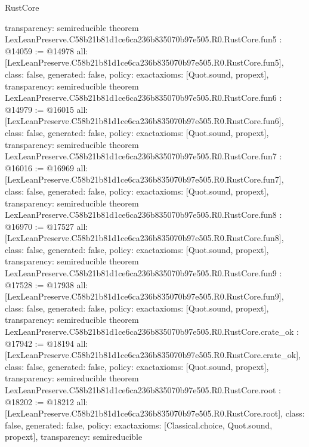 \begin{lexlean}{RustCore}
\begin{coremodule}
{  transparency: semireducible
}
theorem LexLeanPreserve.C58b21b81d1ce6ca236b835070b97e505.R0.RustCore.fun5 : @14059 := @14978 {
  all: [LexLeanPreserve.C58b21b81d1ce6ca236b835070b97e505.R0.RustCore.fun5],
  class: false,
  generated: false,
  policy: exact{axioms: [Quot.sound, propext]},
  transparency: semireducible
}
theorem LexLeanPreserve.C58b21b81d1ce6ca236b835070b97e505.R0.RustCore.fun6 : @14979 := @16015 {
  all: [LexLeanPreserve.C58b21b81d1ce6ca236b835070b97e505.R0.RustCore.fun6],
  class: false,
  generated: false,
  policy: exact{axioms: [Quot.sound, propext]},
  transparency: semireducible
}
theorem LexLeanPreserve.C58b21b81d1ce6ca236b835070b97e505.R0.RustCore.fun7 : @16016 := @16969 {
  all: [LexLeanPreserve.C58b21b81d1ce6ca236b835070b97e505.R0.RustCore.fun7],
  class: false,
  generated: false,
  policy: exact{axioms: [Quot.sound, propext]},
  transparency: semireducible
}
theorem LexLeanPreserve.C58b21b81d1ce6ca236b835070b97e505.R0.RustCore.fun8 : @16970 := @17527 {
  all: [LexLeanPreserve.C58b21b81d1ce6ca236b835070b97e505.R0.RustCore.fun8],
  class: false,
  generated: false,
  policy: exact{axioms: [Quot.sound, propext]},
  transparency: semireducible
}
theorem LexLeanPreserve.C58b21b81d1ce6ca236b835070b97e505.R0.RustCore.fun9 : @17528 := @17938 {
  all: [LexLeanPreserve.C58b21b81d1ce6ca236b835070b97e505.R0.RustCore.fun9],
  class: false,
  generated: false,
  policy: exact{axioms: [Quot.sound, propext]},
  transparency: semireducible
}
theorem LexLeanPreserve.C58b21b81d1ce6ca236b835070b97e505.R0.RustCore.crate_ok : @17942 := @18194 {
  all: [LexLeanPreserve.C58b21b81d1ce6ca236b835070b97e505.R0.RustCore.crate_ok],
  class: false,
  generated: false,
  policy: exact{axioms: [Quot.sound, propext]},
  transparency: semireducible
}
theorem LexLeanPreserve.C58b21b81d1ce6ca236b835070b97e505.R0.RustCore.root : @18202 := @18212 {
  all: [LexLeanPreserve.C58b21b81d1ce6ca236b835070b97e505.R0.RustCore.root],
  class: false,
  generated: false,
  policy: exact{axioms: [Classical.choice, Quot.sound, propext]},
  transparency: semireducible
}


\end{coremodule}
\end{lexlean}
